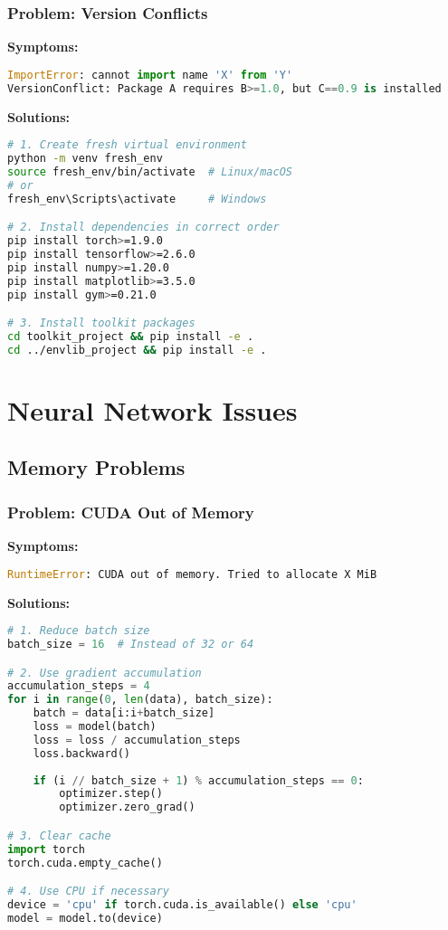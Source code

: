 \subsubsection{Problem: Version Conflicts}

\textbf{Symptoms:}
\begin{lstlisting}[language=python]
ImportError: cannot import name 'X' from 'Y'
VersionConflict: Package A requires B>=1.0, but C==0.9 is installed
\end{lstlisting}

\textbf{Solutions:}

\begin{lstlisting}[language=bash, caption=Resolve Version Conflicts]
# 1. Create fresh virtual environment
python -m venv fresh_env
source fresh_env/bin/activate  # Linux/macOS
# or
fresh_env\Scripts\activate     # Windows

# 2. Install dependencies in correct order
pip install torch>=1.9.0
pip install tensorflow>=2.6.0
pip install numpy>=1.20.0
pip install matplotlib>=3.5.0
pip install gym>=0.21.0

# 3. Install toolkit packages
cd toolkit_project && pip install -e .
cd ../envlib_project && pip install -e .
\end{lstlisting}

\section{Neural Network Issues}

\subsection{Memory Problems}

\subsubsection{Problem: CUDA Out of Memory}

\textbf{Symptoms:}
\begin{lstlisting}[language=python]
RuntimeError: CUDA out of memory. Tried to allocate X MiB
\end{lstlisting}

\textbf{Solutions:}

\begin{lstlisting}[language=python, caption=Fix CUDA Memory Issues]
# 1. Reduce batch size
batch_size = 16  # Instead of 32 or 64

# 2. Use gradient accumulation
accumulation_steps = 4
for i in range(0, len(data), batch_size):
    batch = data[i:i+batch_size]
    loss = model(batch)
    loss = loss / accumulation_steps
    loss.backward()
    
    if (i // batch_size + 1) % accumulation_steps == 0:
        optimizer.step()
        optimizer.zero_grad()

# 3. Clear cache
import torch
torch.cuda.empty_cache()

# 4. Use CPU if necessary
device = 'cpu' if torch.cuda.is_available() else 'cpu'
model = model.to(device)
\end{lstlisting}

